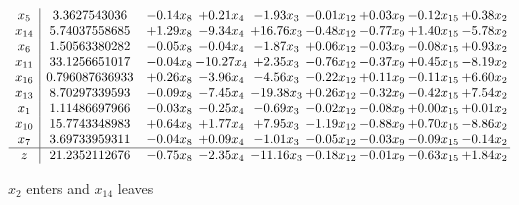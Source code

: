 \documentclass[9pt]{article}
\begin{document}
 \[\begin{array}{c| c c@{\hskip 2pt} c@{\hskip 2pt} c@{\hskip 2pt} c@{\hskip 2pt} c@{\hskip 2pt} c@{\hskip 2pt} c@{\hskip 2pt} }
 x_{5}   &  3.3627543036 & -0.14 x_{8} & +  0.21 x_{4} & -1.93 x_{3} & -0.01 x_{12} & +  0.03 x_{9} & -0.12 x_{15} & +  0.38 x_{2}\\
 x_{14}   &  5.74037558685 & +  1.29 x_{8} & -9.34 x_{4} & + 16.76 x_{3} & -0.48 x_{12} & -0.77 x_{9} & +  1.40 x_{15} & -5.78 x_{2}\\
 x_{6}   &  1.50563380282 & -0.05 x_{8} & -0.04 x_{4} & -1.87 x_{3} & +  0.06 x_{12} & -0.03 x_{9} & -0.08 x_{15} & +  0.93 x_{2}\\
 x_{11}   &  33.1256651017 & -0.04 x_{8} & -10.27 x_{4} & +  2.35 x_{3} & -0.76 x_{12} & -0.37 x_{9} & +  0.45 x_{15} & -8.19 x_{2}\\
 x_{16}   &  0.796087636933 & +  0.26 x_{8} & -3.96 x_{4} & -4.56 x_{3} & -0.22 x_{12} & +  0.11 x_{9} & -0.11 x_{15} & +  6.60 x_{2}\\
 x_{13}   &  8.70297339593 & -0.09 x_{8} & -7.45 x_{4} & -19.38 x_{3} & +  0.26 x_{12} & -0.32 x_{9} & -0.42 x_{15} & +  7.54 x_{2}\\
 x_{1}   &  1.11486697966 & -0.03 x_{8} & -0.25 x_{4} & -0.69 x_{3} & -0.02 x_{12} & -0.08 x_{9} & +  0.00 x_{15} & +  0.01 x_{2}\\
 x_{10}   &  15.7743348983 & +  0.64 x_{8} & +  1.77 x_{4} & +  7.95 x_{3} & -1.19 x_{12} & -0.88 x_{9} & +  0.70 x_{15} & -8.86 x_{2}\\
 x_{7}   &  3.69733959311 & -0.04 x_{8} & +  0.09 x_{4} & -1.01 x_{3} & -0.05 x_{12} & -0.03 x_{9} & -0.09 x_{15} & -0.14 x_{2}\\
\hline
z    &  21.2352112676 & -0.75 x_{8} & -2.35 x_{4} & -11.16 x_{3} & -0.18 x_{12} & -0.01 x_{9} & -0.63 x_{15} & +  1.84 x_{2}\\
\end{array}\]


 $ x_{2} $ enters and $ x_{14} $ leaves 
\end{document}
